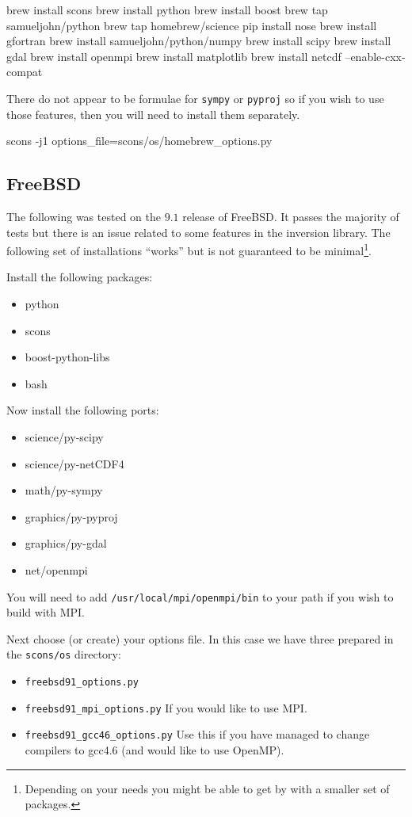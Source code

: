 \begin{shellCode}
brew install scons
brew install python
brew install boost
brew tap samueljohn/python
brew tap homebrew/science
pip install nose
brew install gfortran
brew install samueljohn/python/numpy
brew install scipy
brew install gdal
brew install openmpi
brew install matplotlib
brew install netcdf --enable-cxx-compat
\end{shellCode}

There do not appear to be formulae for \texttt{sympy} or \texttt{pyproj} so if you wish to use those features, then
you will need to install them separately.


\begin{shellCode}
scons -j1 options_file=scons/os/homebrew_options.py
\end{shellCode}


\subsection{FreeBSD}\label{sec:freebsdsrc}
The following was tested on the $9.1$ release of FreeBSD.
It passes the majority of tests but there is an issue related to some features in the inversion library.
The following set of installations ``works'' but is not guaranteed to be minimal\footnote{Depending on your needs you might be able to
get by with a smaller set of packages.}.

Install the following packages:
\begin{itemize}
 \item python
 \item scons
 \item boost-python-libs
 \item bash
\end{itemize}

Now install the following ports:
\begin{itemize}
 \item science/py-scipy
 \item science/py-netCDF4
 \item math/py-sympy
 \item graphics/py-pyproj
 \item graphics/py-gdal
 \item net/openmpi
\end{itemize}

You will need to add \texttt{/usr/local/mpi/openmpi/bin} to your path if you wish to build with MPI.

Next choose (or create) your options file.
In this case we have three prepared in the \texttt{scons/os} directory:
\begin{itemize}
 \item \texttt{freebsd91_options.py}
 \item \texttt{freebsd91_mpi_options.py}     If you would like to use MPI.
 \item \texttt{freebsd91_gcc46_options.py}   Use this if you have managed to change compilers to gcc4.6 (and would like to use OpenMP).
\end{itemize}

